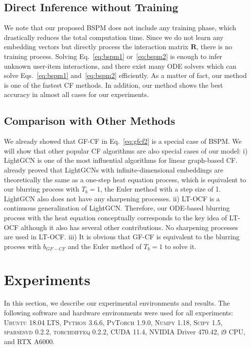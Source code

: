 \documentclass[sigconf,natbib=true]{acmart}
\begin{document}
\subsection{Direct Inference without Training}
We note that our proposed BSPM does not include any training phase, which drastically reduces the total computation time. Since we do not learn any embedding vectors but directly process the interaction matrix $\bm{R}$, there is no training process. Solving Eq.~\eqref{eq:bspm1} or~\eqref{eq:bspm2} is enough to infer unknown user-item interactions, and there exist many ODE solvers which can solve Eqs.~\eqref{eq:bspm1} and~\eqref{eq:bspm2} efficiently. As a matter of fact, our method is one of the fastest CF methods. In addition, our method shows the best accuracy in almost all cases for our experiments.

\subsection{Comparison with Other Methods}
We already showed that GF-CF in Eq.~\eqref{eq:gfcf2} is a special case of BSPM. We will show that other popular CF algorithms are also special cases of our model: i) LightGCN is one of the most influential algorithms for linear graph-based CF. \citet{Shen21GFCF} already proved that LightGCNs with infinite-dimensional embeddings are theoretically the same as a one-step heat equation process, which is equivalent to our blurring process with $T_b=1$, the Euler method with a step size of 1. LightGCN also does not have any sharpening processes. ii) LT-OCF is a continuous generalization of LightGCN. Therefore, our ODE-based blurring process with the heat equation conceptually corresponds to the key idea of LT-OCF although it also has several other contributions. No sharpening processes are used in LT-OCF. iii) It is obvious that GF-CF is equivalent to the blurring process with $b_{GF-CF}$ and the Euler method of $T_b=1$ to solve it.


\section{Experiments}
In this section, we describe our experimental environments and results. The following software and hardware environments were used for all experiments: \textsc{Ubuntu} 18.04 LTS, \textsc{Python} 3.6.6, \textsc{PyTorch} 1.9.0, \textsc{Numpy} 1.18, \textsc{Scipy} 1.5, \textsc{sparsesvd} 0.2.2, \textsc{torchdiffeq} 0.2.2, \textsc{CUDA} 11.4, \textsc{NVIDIA} Driver 470.42, i9 CPU, and \textsc{RTX A6000}.
\end{document}
